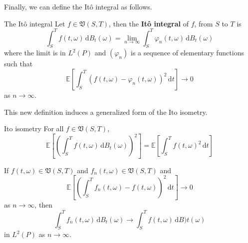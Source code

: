 Finally, we can define the Itô integral as follows.

\begin{definition}[]{The Itô integral}{}
	Let $f \in \mathfrak{V}(S,T)$, then the \textbf{Itô integral} of $f$, from $S$ to $T$ is
	\[
		\int_S^T f(t, \omega) \, \mathrm{d}B_t(\omega) = \lim_{n \to \infty} \int_S^T \varphi_n (t, \omega)  \, \mathrm{d}B_t(\omega)
	\]
	where the limit is in $L^2(P)$ and $(\varphi_n)$ is a sequence of elementary functions such that
	\[
		\mathbb{E} \left[ \int_S^T (f(t, \omega) - \varphi_n(t, \omega))^2 \, \mathrm{d}t \right] \longrightarrow 0
	\] 
	as $n \to \infty$.
\end{definition}

This new definition induces a generalized form of the Ito isometry.

\begin{theorem}[]{Ito isometry}{}
	For all $f \in \mathfrak{V}(S,T)$,	
	\[
		\mathbb{E}\left[\left( \int_S^T f(t,\omega) \, \mathrm{d}B_t(\omega) \right)^2 \right] = \mathbb{E} \left[\int_S^T f(t,\omega)^2 \, \mathrm{d}t \right]
	\]
\end{theorem}

\begin{corollary}[]{}{}
	If $f(t, \omega) \in \mathfrak{V}(S,T)$ and $f_n(t, \omega) \in \mathfrak{V}(S,T)$ and
	\[
		\mathbb{E}\left[\left( \int_S^T f_n(t,\omega) - f(t, \omega) \right)^2 \, \mathrm{d}t \right] \longrightarrow 0
		\]
	as $n \to \infty$, then
	\[
		\int_S^T f_n(t, \omega) \, \mathrm{d}B_t(\omega) \longrightarrow \int_S^T f(t, \omega) \, \mathrm{d} B)t(\omega)
	\]
	in $L^2(P)$ as $n \to \infty$.
\end{corollary}

